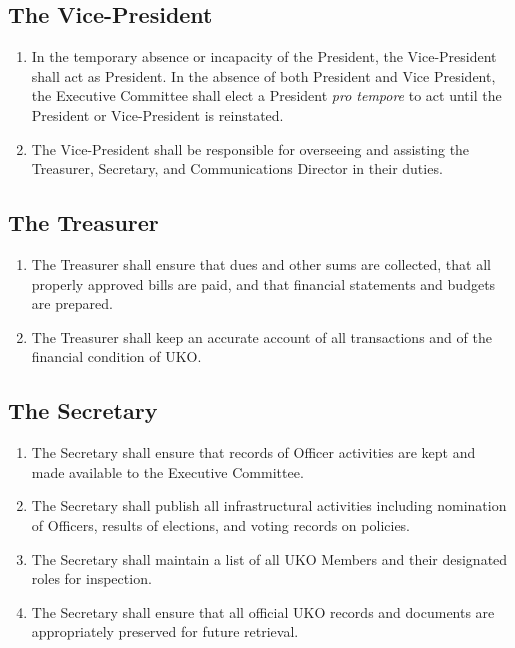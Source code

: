 \documentclass[12pt,executivepaper]{article}
\begin{document}
\subsection{The Vice-President}
\begin{enumerate}
    \item In the temporary absence or incapacity of the President, the
          Vice-President shall act as President. In the absence of both
          President and Vice President, the Executive Committee shall elect a
          President \textit{pro tempore} to act until the President or
          Vice-President is reinstated.
    \item The Vice-President shall be responsible for overseeing and assisting
          the Treasurer, Secretary, and Communications Director in their
          duties.
\end{enumerate}

\subsection{The Treasurer}
\begin{enumerate}
    \item The Treasurer shall ensure that dues and other sums are collected,
          that all properly approved bills are paid, and that financial
          statements and budgets are prepared.
    \item The Treasurer shall keep an accurate account of all transactions and
          of the financial condition of UKO.
\end{enumerate}

\subsection{The Secretary}
\begin{enumerate}
    \item The Secretary shall ensure that records of Officer activities are
          kept and made available to the Executive Committee.
    \item The Secretary shall publish all infrastructural activities including
          nomination of Officers, results of elections, and voting records on
          policies.
    \item The Secretary shall maintain a list of all UKO Members and their
          designated roles for inspection.
    \item The Secretary shall ensure that all official UKO records and
          documents are appropriately preserved for future retrieval.
\end{enumerate}
\end{document}
